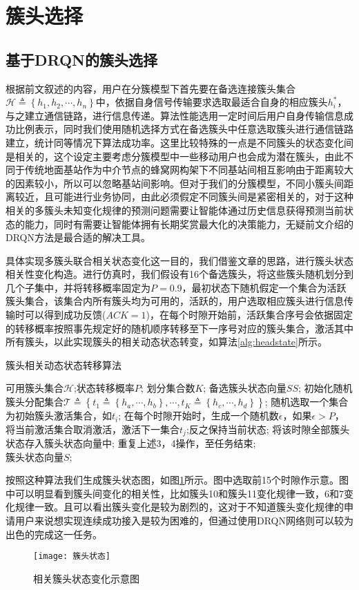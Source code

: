 \section{簇头选择}
\subsection{基于DRQN的簇头选择}
根据前文叙述的内容，用户在分簇模型下首先要在备选连接簇头集合$\mathcal{H} \triangleq \left \{ h_{1} ,h_{2},\cdots,h_{n}\right \}$中，依据自身信号传输要求选取最适合自身的相应簇头$h_{i}^{*}$，与之建立通信链路，进行信息传递。算法性能选用一定时间后用户自身传输信息成功比例表示，同时我们使用随机选择方式在备选簇头中任意选取簇头进行通信链路建立，统计同等情况下算法成功率。这里比较特殊的一点是不同簇头的状态变化间是相关的，这个设定主要考虑分簇模型中一些移动用户也会成为潜在簇头，由此不同于传统地面基站作为中介节点的蜂窝网构架下不同基站间相互影响由于距离较大的因素较小，所以可以忽略基站间影响。但对于我们的分簇模型，不同小簇头间距离较近，且可能进行业务协同，由此必须假定不同簇头间是紧密相关的，对于这种相关的多簇头未知变化规律的预测问题需要让智能体通过历史信息获得预测当前状态的能力，同时有需要让智能体拥有长期奖赏最大化的决策能力，无疑前文介绍的DRQN方法是最合适的解决工具。

具体实现多簇头联合相关状态变化这一目的，我们借鉴文章\cite{8303773}的思路，进行簇头状态相关性变化构造。进行仿真时，我们假设有16个备选簇头，将这些簇头随机划分到几个子集中，并将转移概率固定为$P=0.9$，最初状态下随机假定一个集合为活跃簇头集合，该集合内所有簇头均为可用的，活跃的，用户选取相应簇头进行信息传输时可以得到成功反馈($ACK=1$)，在每个时隙开始前，活跃集合序号会依据固定的转移概率按照事先规定好的随机顺序转移至下一序号对应的簇头集合，激活其中所有簇头，以此实现簇头的相关动态状态转变，如算法\ref{alg:headstate}所示。
\begin{algorithm}[htb]  
	\caption{簇头相关动态状态转移算法}  
	\label{alg:headstate}  
	\begin{algorithmic}[1]  
		\Require  
		 可用簇头集合$\mathcal{H}$;状态转移概率$P$; 划分集合数$K$; 
		\Ensure  
		 备选簇头状态向量$SS$;  
		\State 初始化随机簇头分配集合$\mathcal{T}\triangleq\left \{ t_{1}\triangleq\left \{h_{a},\cdots,h_{b}\right \} ,\cdots,t_{K}\triangleq\left \{h_{c},\cdots,h_{d}\right \}\right \}$;
		\State 随机选取一个集合为初始簇头激活集合，如$t_{i}$;				
		\State 在每个时隙开始时，生成一个随机数$\epsilon$，如果$\epsilon>P$，将当前激活集合取消激活，激活下一集合$t_{j}$;反之保持当前状态;  
		\State 将该时隙全部簇头状态存入簇头状态向量中;
		\State 重复上述3，4操作，至任务结束; \\
		\Return 簇头状态向量$S$;  
	\end{algorithmic}  
\end{algorithm}  
按照这种算法我们生成簇头状态图，如图\ref{fig:簇头状态}所示。图中选取前15个时隙作示意。图中可以明显看到簇头间变化的相关性，比如簇头10和簇头11变化规律一致，6和7变化规律一致。且可以看出簇头变化是较为剧烈的，这对于不知道簇头变化规律的申请用户来说想实现连续成功接入是较为困难的，但通过使用DRQN网络则可以较为出色的完成这一任务。
\begin{figure}[htbp]
	\centering
	\texttt{[image: 簇头状态]}
	\caption{相关簇头状态变化示意图}
	\label{fig:簇头状态}
\end{figure}



